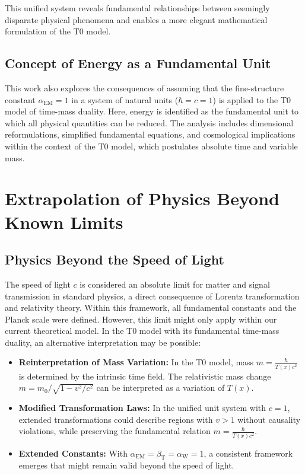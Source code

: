 \documentclass[12pt,a4paper]{article}
\newcommand{\Tfield}{T(x)}
\newcommand{\betaT}{\beta_{\text{T}}}
\newcommand{\alphaEM}{\alpha_{\text{EM}}}
\newcommand{\alphaW}{\alpha_{\text{W}}}
\begin{document}
	This unified system reveals fundamental relationships between seemingly disparate physical phenomena and enables a more elegant mathematical formulation of the T0 model.
	
	\subsection{Concept of Energy as a Fundamental Unit}
	
	This work also explores the consequences of assuming that the fine-structure constant \(\alphaEM = 1\) in a system of natural units (\(\hbar = c = 1\)) is applied to the T0 model of time-mass duality. Here, energy is identified as the fundamental unit to which all physical quantities can be reduced. The analysis includes dimensional reformulations, simplified fundamental equations, and cosmological implications within the context of the T0 model, which postulates absolute time and variable mass.
	
	\section{Extrapolation of Physics Beyond Known Limits}
	
	\subsection{Physics Beyond the Speed of Light}
	
	The speed of light \(c\) is considered an absolute limit for matter and signal transmission in standard physics, a direct consequence of Lorentz transformation and relativity theory. Within this framework, all fundamental constants and the Planck scale were defined. However, this limit might only apply within our current theoretical model. In the T0 model with its fundamental time-mass duality, an alternative interpretation may be possible:
	
	\begin{itemize}
		\item \textbf{Reinterpretation of Mass Variation:} In the T0 model, mass \(m = \frac{\hbar}{\Tfield c^2}\) is determined by the intrinsic time field. The relativistic mass change \(m = m_0/\sqrt{1-v^2/c^2}\) can be interpreted as a variation of \(\Tfield\).
		\item \textbf{Modified Transformation Laws:} In the unified unit system with \(c = 1\), extended transformations could describe regions with \(v > 1\) without causality violations, while preserving the fundamental relation \(m = \frac{\hbar}{\Tfield c^2}\).
		\item \textbf{Extended Constants:} With \(\alphaEM = \betaT = \alphaW = 1\), a consistent framework emerges that might remain valid beyond the speed of light.
	\end{itemize}
	
\end{document}

